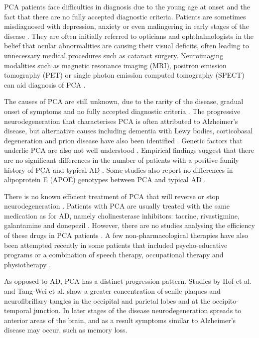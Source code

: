 PCA patients face difficulties in diagnosis due to the young age at onset and the fact that there are no fully accepted diagnostic criteria. Patients are sometimes misdiagnosed with depression, anxiety or even malingering in early stages of the disease \cite{crutch2012posterior}. They are often initially referred to opticians and ophthalmologists in the belief that ocular abnormalities are causing their visual deficits, often leading to unnecessary medical procedures such as cataract surgery. Neuroimaging modalities such as magnetic resonance imaging (MRI), positron emission tomography (PET) or single photon emission computed tomography (SPECT) can aid diagnosis of PCA \cite{goldstein2011posterior}. 

The causes of PCA are still unknown, due to the rarity of the disease, gradual onset of symptoms and no fully accepted diagnostic criteria \cite{borruat2013posterior,crutch2012posterior}. The progressive neurodegeneration that characterises PCA is often attributed to Alzheimer's disease, but alternative causes including dementia with Lewy bodies, corticobasal degeneration and prion disease have also been identified \cite{crutch2012posterior}. Genetic factors that underlie PCA are also not well understood \cite{crutch2012posterior,borruat2013posterior}. Empirical findings suggest that there are no significant differences in the number of patients with a positive family history of PCA and typical AD \cite{crutch2012posterior}. Some studies also report no differences in alipoprotein E (APOE) genotypes between PCA and typical AD \cite{mendez2002posterior, tang2004clinical,rosenbloom2011distinct}. 

There is no known efficient treatment of PCA that will reverse or stop neurodegeneration \cite{borruat2013posterior}. Patients with PCA are usually treated with the same medication as for AD, namely cholinesterase inhibitors: tacrine, rivastigmine, galantamine and donepezil \cite{borruat2013posterior}. However, there are no studies analysing the efficiency of these drugs in PCA patients \cite{borruat2013posterior}. A few non-pharmacological therapies have also been attempted recently in some patients that included psycho-educative programs \cite{videaud2012impact} or a combination of speech therapy, occupational therapy and physiotherapy \cite{weill2012physical}.

As opposed to AD, PCA has a distinct progression pattern. Studies by Hof et al. \cite{hof1997atypical} and Tang-Wei et al. \cite{tang2004clinical} show a greater concentration of senile plaques and neurofibrillary tangles in the occipital and parietal lobes and at the occipito-temporal junction. In later stages of the disease neurodegeneration spreads to anterior areas of the brain, and as a result symptoms similar to Alzheimer's disease may occur, such as memory loss.

